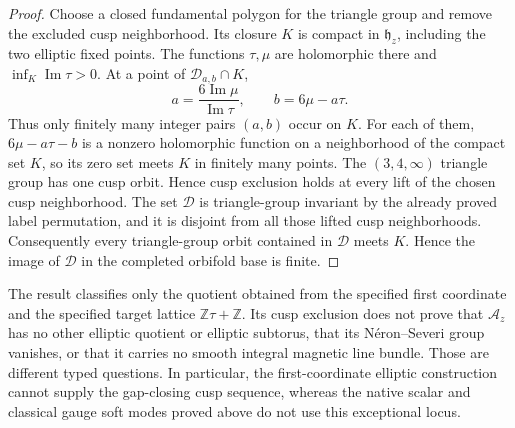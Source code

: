 \begin{proof}
Choose a closed fundamental polygon for the triangle group and remove the
excluded cusp neighborhood.  Its closure \(K\) is compact in
\(\mathfrak h_z\), including the two elliptic fixed points.  The functions
\(\tau,\mu\) are holomorphic there and
\(\inf_K\operatorname{Im}\tau>0\).  At a point of
\(\mathcal D_{a,b}\cap K\),
\begin{equation}
 a=\frac{6\operatorname{Im}\mu}{\operatorname{Im}\tau},
 \qquad
 b=6\mu-a\tau.
 \label{cusp-spec-compact-label-bounds}
\end{equation}
Thus only finitely many integer pairs \((a,b)\) occur on \(K\).  For each of
them, \(6\mu-a\tau-b\) is a nonzero holomorphic function on a neighborhood of
the compact set \(K\), so its zero set meets \(K\) in finitely many points.
The \((3,4,\infty)\) triangle group has one cusp orbit.  Hence cusp exclusion
holds at every lift of the chosen cusp neighborhood.  The set
\(\mathcal D\) is triangle-group invariant by the already proved label
permutation, and it is disjoint from all those lifted cusp neighborhoods.
Consequently every triangle-group orbit contained in \(\mathcal D\) meets
\(K\).  Hence the image of \(\mathcal D\) in the completed orbifold base is
finite.
\end{proof}

\begin{remark}
\label{cusp-spec-elliptic-descent-scope}
The result classifies only the quotient obtained from the specified first
coordinate and the specified target lattice
\(\mathbb Z\tau+\mathbb Z\).  Its cusp exclusion does not prove that
\(\mathcal A_z\) has no other elliptic quotient or elliptic subtorus, that its
N\'eron--Severi group vanishes, or that it carries no smooth integral
magnetic line bundle.  Those are different typed questions.  In particular,
the first-coordinate elliptic construction cannot supply the gap-closing
cusp sequence, whereas the native scalar and classical gauge soft modes
proved above do not use this exceptional locus.
\end{remark}

